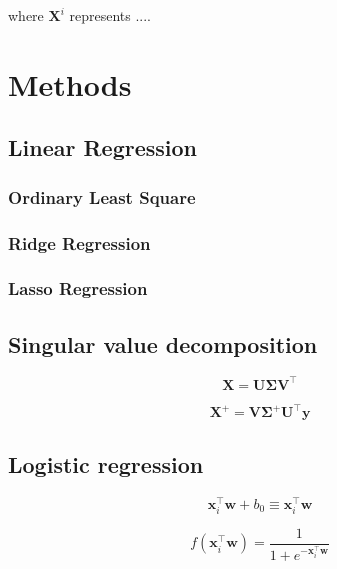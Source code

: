 \documentclass[a4paper,12pt, english]{article}
\begin{document}
where $\mathbf{X}^i$ represents ....

\section{Methods}

\subsection{Linear Regression}

\subsubsection{Ordinary Least Square}

\subsubsection{Ridge Regression}

\subsubsection{Lasso Regression}

\subsection{Singular value decomposition}

\begin{equation} \label{eq:SVD}
\mathbf{X} = \mathbf{U} \mathbf{\Sigma} \mathbf{V}^\top
\end{equation}

\begin{equation}
\mathbf{X}^+ = \mathbf{V} \mathbf{\Sigma}^+ \mathbf{U}^\top \mathbf{y}
\end{equation}

\subsection{Logistic regression}

\begin{equation}
\mathbf{x}_i^{\top} \mathbf{w} + b_0 \equiv \mathbf{x}_i^{\top} \mathbf{w} 
\end{equation}

\begin{equation}
f(\mathbf{x}_i^{\top} \mathbf{w}) = \frac{1}{1 + e^{-\mathbf{x}_i^{\top} \mathbf{w}}}
\end{equation}
\end{document}
